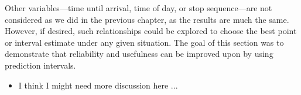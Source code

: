 Other variables---time until arrival, time of day, or stop sequence---are not considered as we did in the previous chapter, as the results are much the same. However, if desired, such relationships could be explored to choose the best point or interval estimate under any given situation. The goal of this section was to demonstrate that reliability and usefulness can be improved upon by using prediction intervals.

\begin{itemize}
\item I think I might need more discussion here ...
\end{itemize}
